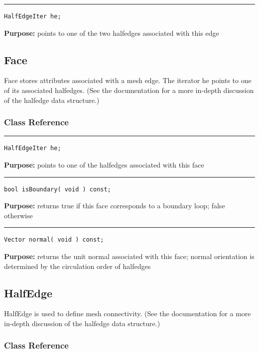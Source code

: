 \documentclass{article}
\begin{document}
\rule{5in}{1pt}
\begin{verbatim}
HalfEdgeIter he;
\end{verbatim}
\textbf{Purpose:}
points to one of the two halfedges associated with this edge
\pagebreak\subsection{Face}

 

 Face stores attributes associated with a mesh edge.  The iterator he points to one of its associated halfedges.  (See the documentation for a more in-depth discussion of the halfedge data structure.) 



\subsubsection{Class Reference}

\rule{5in}{1pt}
\begin{verbatim}
HalfEdgeIter he;
\end{verbatim}
\textbf{Purpose:}
points to one of the halfedges associated with this face

\hspace{-.21in}\rule{5in}{1pt}
\begin{verbatim}
bool isBoundary( void ) const;
\end{verbatim}
\textbf{Purpose:}
returns true if this face corresponds to a
boundary loop; false otherwise

\hspace{-.21in}\rule{5in}{1pt}
\begin{verbatim}
Vector normal( void ) const;
\end{verbatim}
\textbf{Purpose:}
returns the unit normal associated with this face; normal
orientation is determined by the circulation order of halfedges
\pagebreak\subsection{HalfEdge}

 

 HalfEdge is used to define mesh connectivity.  (See the documentation for a more in-depth discussion of the halfedge data structure.) 



\subsubsection{Class Reference}
\end{document}
